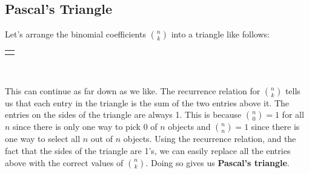\documentclass[10pt,]{book}
\newcommand{\terminology}[1]{\textbf{#1}}
\theoremstyle{plain}
\theoremstyle{definition}
\theoremstyle{definition}
\theoremstyle{definition}
\theoremstyle{definition}
\numberwithin{equation}{chapter}
\newlength{\panelmax}
\begin{document}
\subsection[{Pascal's Triangle}]{Pascal's Triangle}\label{subsec_Pascal}
\hypertarget{p-832}{}%
Let's arrange the binomial coefficients \({n \choose k}\) into a triangle like follows:%
{%
\setlength{\panelmax}{0pt}
\ifdefined\panelboxAimage\else\newsavebox{\panelboxAimage}\fi%
\begin{lrbox}{\panelboxAimage}
\end{lrbox}
\ifdefined\phAimage\else\newlength{\phAimage}\fi%
\setlength{\phAimage}{\ht\panelboxAimage+\dp\panelboxAimage}
\settototalheight{\phAimage}{\usebox{\panelboxAimage}}
\setlength{\panelmax}{\maxof{\panelmax}{\phAimage}}
\leavevmode%
\setlength{\tabcolsep}{0\linewidth}
\par\medskip\noindent
\hspace*{0.15\linewidth}%
\begin{tabular}{@{}*{1}{c}@{}}
\begin{minipage}[c][\panelmax][t]{0.7\linewidth}\usebox{\panelboxAimage}\end{minipage}\end{tabular}\\
}%
\par
\hypertarget{p-833}{}%
This can continue as far down as we like. The recurrence relation for \({n \choose k}\) tells us that each entry in the triangle is the sum of the two entries above it. The entries on the sides of the triangle are always 1. This is because \({n \choose 0} = 1\) for all \(n\) since there is only one way to pick 0 of \(n\) objects and \({n \choose n} = 1\) since there is one way to select all \(n\) out of \(n\) objects. Using the recurrence relation, and the fact that the sides of the triangle are 1's, we can easily replace all the entries above with the correct values of \({n \choose k}\). Doing so gives us \terminology{Pascal's triangle}.%
\end{document}
